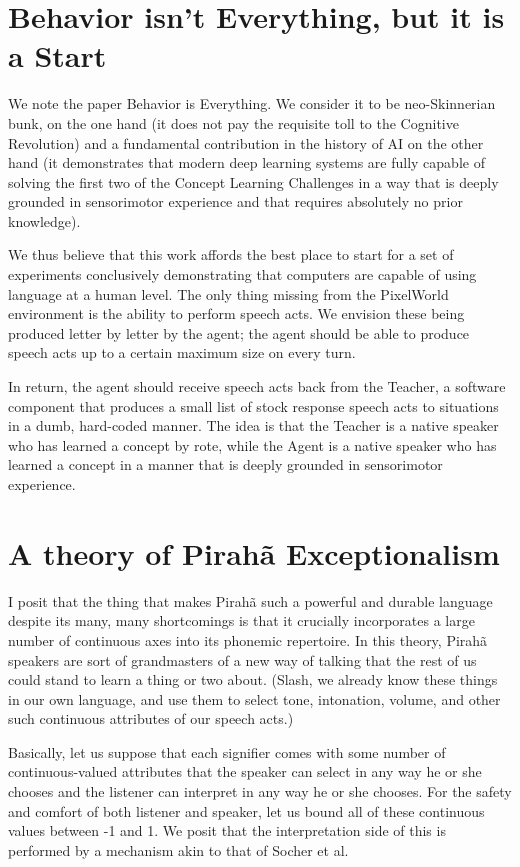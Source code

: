 \documentclass{article}
\begin{document}
\section{Behavior isn't Everything, but it is a Start}

We note the paper Behavior is Everything. We consider it to be
neo-Skinnerian bunk, on the one hand (it does not pay the requisite
toll to the Cognitive Revolution) and a fundamental contribution in
the history of AI on the other hand (it demonstrates that modern deep
learning systems are fully capable of solving the first two of the
Concept Learning Challenges in a way that is deeply grounded in
sensorimotor experience and that requires absolutely no prior
knowledge).

We thus believe that this work affords the best place to start for a
set of experiments conclusively demonstrating that computers are
capable of using language at a human level. The only thing missing
from the PixelWorld environment is the ability to perform speech
acts. We envision these being produced letter by letter by the agent;
the agent should be able to produce speech acts up to a certain
maximum size on every turn.

In return, the agent should receive speech acts back from the Teacher,
a software component that produces a small list of stock response
speech acts to situations in a dumb, hard-coded manner. The idea is
that the Teacher is a native speaker who has learned a concept by
rote, while the Agent is a native speaker who has learned a concept in
a manner that is deeply grounded in sensorimotor experience.

\section{A theory of Pirah\~{a} Exceptionalism}

I posit that the thing that makes Pirah\~{a} such a powerful and
durable language despite its many, many shortcomings is that it
crucially incorporates a large number of continuous axes into its
phonemic repertoire. In this theory, Pirah\~{a} speakers are sort of
grandmasters of a new way of talking that the rest of us could stand
to learn a thing or two about. (Slash, we already know these things in
our own language, and use them to select tone, intonation, volume, and
other such continuous attributes of our speech acts.)

Basically, let us suppose that each signifier comes with some number
of continuous-valued attributes that the speaker can select in any way
he or she chooses and the listener can interpret in any way he or she
chooses. For the safety and comfort of both listener and speaker, let
us bound all of these continuous values between -1 and 1. We posit
that the interpretation side of this is performed by a mechanism akin
to that of Socher et al.
\end{document}
